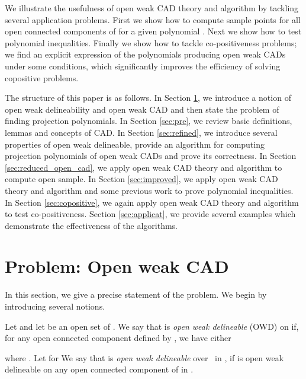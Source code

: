 \documentclass[amsthm]{elsart}
\begin{document}
We illustrate the usefulness of open weak CAD theory and algorithm by tackling several application problems. First we show how to compute sample points for all open connected components of  for a given polynomial . Next we show how to test polynomial inequalities. Finally we  show how to tackle  co-positiveness problems; we find an explicit expression of the polynomials producing open weak CADs under some conditions, which significantly improves the efficiency of solving copositive problems.








The structure of this paper is as follows. In Section \ref{sec:problem}, we introduce a notion of  open weak delineability  and open weak CAD and then state the problem of finding projection polynomials. In Section \ref{sec:pre}, we review basic definitions, lemmas and concepts of CAD. In Section \ref{sec:refined}, we introduce several properties of open weak delineable, provide an algorithm for computing projection polynomials of open weak CADs  and prove its correctness. In Section \ref{sec:reduced_open_cad}, we apply open weak CAD theory and algorithm to  compute open sample. In Section \ref{sec:improved}, we apply open weak CAD theory and algorithm and some previous work \citep{han2016proving} to prove  polynomial inequalities.    In Section \ref{sec:copositive}, we again  apply open weak CAD theory and algorithm to  test co-positiveness. Section \ref{sec:applicat}, we provide  several examples which demonstrate the effectiveness of the algorithms. 



 \section{Problem: Open weak CAD}\label{sec:problem}



 In this section, we give a precise statement of the problem.  We begin by  introducing several notions.

 \begin{defn} \label{def:weakopendeli}
Let   and let  be an open set of . We say that  is  {\em open weak delineable} (OWD) on  if, for any open connected component  defined by , we have either

where .
Let  for  We say
that  is {\em open weak delineable\/} over~ in , if  is open weak delineable on any open connected component of  in .
\end{defn}
\end{document}
